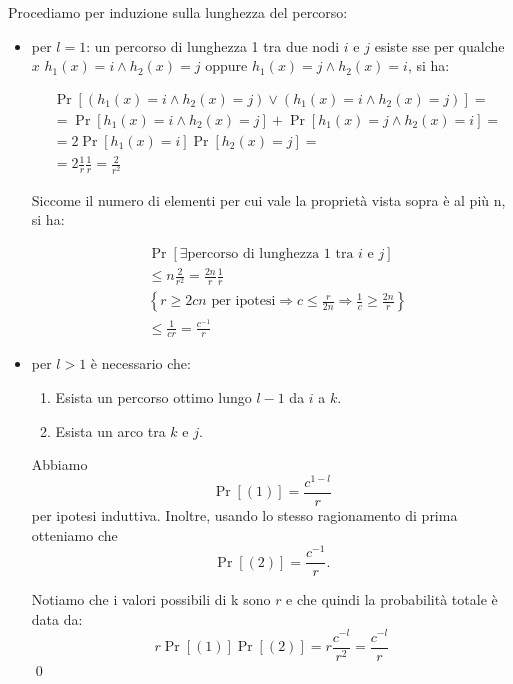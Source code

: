 \begin{proof*}
    Procediamo per induzione sulla lunghezza del percorso:
    \begin{itemize}
    \item per $l = 1$: un percorso di lunghezza 1 tra due nodi $i$ e $j$ esiste
    sse per qualche $x$ $h_1(x) = i \land h_2(x) = j$ oppure $h_1(x) = j \land
    h_2(x) = i$, si ha:
    
    \begin{align}
        &\Pr\left[(h_1(x) = i \land h_2(x) = j) \lor (h_1(x) = i \land h_2(x) = j) \right] = \nonumber \\
        &= \Pr\left[h_1(x) = i \land h_2(x) = j\right] + \Pr\left[h_1(x) = j \land h_2(x) = i\right] = \nonumber \\
        &= 2 \Pr\left[h_1(x) = i\right]\Pr\left[h_2(x) = j\right] = \nonumber \\
        &= 2 \frac{1}{r} \frac{1}{r} = \frac{2}{r^2} \nonumber
    \end{align}

    Siccome il numero di elementi per cui vale la proprietà vista sopra è al
    più n, si ha:

    \begin{align}
        & \Pr\left[\exists \mbox{percorso di lunghezza 1 tra $i$ e $j$}\right] \nonumber \\
        &\le n \frac{2}{r^2} = \frac{2n}{r} \frac{1}{r} \nonumber \\
        &\left\{r \ge 2cn \mbox{ per ipotesi} \Rightarrow c \le \frac{r}{2n}
            \Rightarrow \frac{1}{c} \ge \frac{2n}{r} \right\} \nonumber \\
        &\le \frac {1}{cr} = \frac{c^{-1}}{r} \nonumber
    \end{align}

    \item per $l > 1$ è necessario che:
        \begin{enumerate}
            \item Esista un percorso ottimo lungo $l-1$ da $i$ a $k$.
            \item Esista un arco tra $k$ e $j$.
        \end{enumerate}
        Abbiamo
            \[\Pr[(1)] = \frac{c^{1-l}}{r}\]
        per ipotesi induttiva. Inoltre, usando lo stesso ragionamento di prima
        otteniamo che
            \[\Pr[(2)]= \frac{c^{-1}}{r}.\]

        Notiamo che i valori possibili di k sono $r$ e che quindi la probabilità
        totale è data da:
        \[r \Pr[(1)]\Pr[(2)] = r\frac{c^{-l}}{r^2} = \frac{c^{-l}}{r}\] \qed
    \end{itemize}
\end{proof*}

